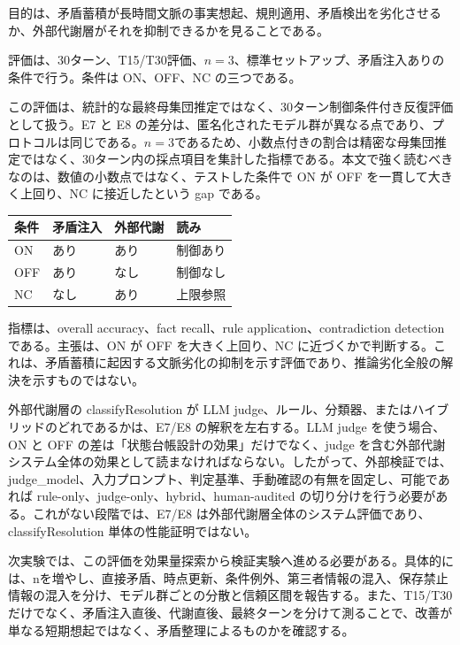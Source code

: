 \documentclass[12pt,a4paper]{article}
\begin{document}
目的は、矛盾蓄積が長時間文脈の事実想起、規則適用、矛盾検出を劣化させるか、外部代謝層がそれを抑制できるかを見ることである。

評価は、30ターン、T15/T30評価、\(n=3\)、標準セットアップ、矛盾注入ありの条件で行う。条件は ON、OFF、NC の三つである。

この評価は、統計的な最終母集団推定ではなく、30ターン制御条件付き反復評価として扱う。E7 と E8 の差分は、匿名化されたモデル群が異なる点であり、プロトコルは同じである。\(n=3\)であるため、小数点付きの割合は精密な母集団推定ではなく、30ターン内の採点項目を集計した指標である。本文で強く読むべきなのは、数値の小数点ではなく、テストした条件で ON が OFF を一貫して大きく上回り、NC に接近したという gap である。

{\def\LTcaptype{table} %
\begin{longtable}[]{@{}llll@{}}
\toprule\noalign{}
条件 & 矛盾注入 & 外部代謝 & 読み \\
\midrule\noalign{}
\endhead
\bottomrule\noalign{}
\endlastfoot
ON & あり & あり & 制御あり \\
OFF & あり & なし & 制御なし \\
NC & なし & あり & 上限参照 \\
\end{longtable}
}

指標は、overall accuracy、fact recall、rule application、contradiction detection である。主張は、ON が OFF を大きく上回り、NC に近づくかで判断する。これは、矛盾蓄積に起因する文脈劣化の抑制を示す評価であり、推論劣化全般の解決を示すものではない。

外部代謝層の classifyResolution が LLM judge、ルール、分類器、またはハイブリッドのどれであるかは、E7/E8 の解釈を左右する。LLM judge を使う場合、ON と OFF の差は「状態台帳設計の効果」だけでなく、judge を含む外部代謝システム全体の効果として読まなければならない。したがって、外部検証では、judge\_model、入力プロンプト、判定基準、手動確認の有無を固定し、可能であれば rule-only、judge-only、hybrid、human-audited の切り分けを行う必要がある。これがない段階では、E7/E8 は外部代謝層全体のシステム評価であり、classifyResolution 単体の性能証明ではない。

次実験では、この評価を効果量探索から検証実験へ進める必要がある。具体的には、nを増やし、直接矛盾、時点更新、条件例外、第三者情報の混入、保存禁止情報の混入を分け、モデル群ごとの分散と信頼区間を報告する。また、T15/T30だけでなく、矛盾注入直後、代謝直後、最終ターンを分けて測ることで、改善が単なる短期想起ではなく、矛盾整理によるものかを確認する。
\end{document}
